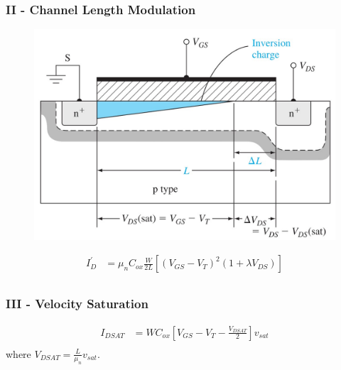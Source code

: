 \documentclass{beamer}
\begin{document}
    \begin{frame} \frametitle{II - Channel Length Modulation}
        \begin{figure}[H]
            \centering
            \includegraphics[width=0.6\linewidth]{Channel-length-modulation.jpg}
            \label{fig:Channel-length-modulation.jpg}
        \end{figure}
        \begin{equation*}
            \begin{aligned}
                 I^\prime_D &= \mu_n C_{ox} \frac{W}{2L} \left[\left( V_{GS} - V_T \right)^2  (1 + \lambda V_{DS}) \right] \\
            \end{aligned}
        \end{equation*}
    \end{frame}

    \begin{frame} \frametitle{III - Velocity Saturation}
        \begin{equation*}
            \begin{aligned}
                I_{DSAT} &= WC_{ox} \left[ V_{GS} - V_{T} - \frac{V_{DSAT} }{2}  \right] v_{sat} \\
            \end{aligned}
        \end{equation*}
        where $V_{DSAT} = \frac{L}{\mu_n} v_{sat}$.
    \end{frame}
\end{document}
